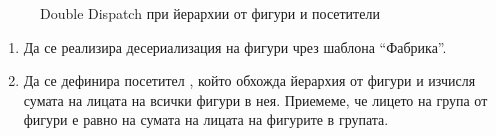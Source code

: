 \begin{figure}
  
  \caption{Double Dispatch при йерархии от фигури и посетители}
  \label{fig:visitor}
  \end{figure}  


\begin{enumerate}[resume]
  \item Да се реализира десериализация на фигури чрез шаблона ``Фабрика''.
  \item Да се дефинира посетител , който обхожда йерархия от фигури и изчисля сумата на лицата на всички фигури в нея. Приемеме, че лицето на група от фигури е равно на сумата на лицата на фигурите в групата.
  
\end{enumerate}

